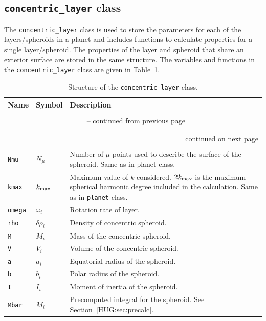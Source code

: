 \documentclass[11pt, oneside]{article}   	%
\begin{document}
\subsection{\texttt{concentric\_layer} class}
\label{HUG:sec:layer_class}

The \texttt{concentric\_layer} class is used to store the parameters for each of the layers/spheroids in a planet and includes functions to calculate properties for a single layer/spheroid. The properties of the layer and spheroid that share an exterior surface are stored in the same structure. 
The variables and functions in the \texttt{concentric\_layer} class are given in Table~\ref{HUG:tab:concentric_layer_class}.

\begin{longtable}{l l p{10cm}}
\caption{Structure of the \texttt{concentric\_layer} class.}
\label{HUG:tab:concentric_layer_class} \\

Name & Symbol & Description \\ \hline \hline
\multicolumn{3}{l}{} \\
\endfirsthead

\multicolumn{3}{c}{{\tablename\ \thetable{} -- continued from previous page}} \\
\multicolumn{3}{l}{} \\
\endhead

\multicolumn{3}{l}{} \\
\multicolumn{3}{r}{{continued on next page}} \\
\endfoot

\endlastfoot

\multicolumn{3}{l}{Variables} \\
\hline
\texttt{Nmu} & $N_{\mu}$ & Number of $\mu$ points used to describe the surface of the spheroid. Same as in planet class. \\
\texttt{kmax} & $k_{\rm max}$ & Maximum value of $k$ considered. $2k_{\rm max}$ is the maximum spherical harmonic degree included in the calculation. Same as in \texttt{planet} class. \\
\texttt{omega} & $\omega_i$ & Rotation rate of layer.  \\
\texttt{rho} & $\delta \rho_i$ & Density of concentric spheroid. \\
\texttt{M} & $M_i$ & Mass of the concentric spheroid. \\
\texttt{V} & $V_i$ & Volume of the concentric spheroid. \\
\texttt{a} & $a_i$ & Equatorial radius of the spheroid. \\
\texttt{b} & $b_i$ & Polar radius of the spheroid. \\
\texttt{I} & $I_i$ & Moment of inertia of the spheroid. \\
\texttt{Mbar} & $\bar{M}_i$ & Precomputed integral for the spheroid. See Section~\ref{HUG:sec:precalc}. \\



\end{longtable}
\end{document}
